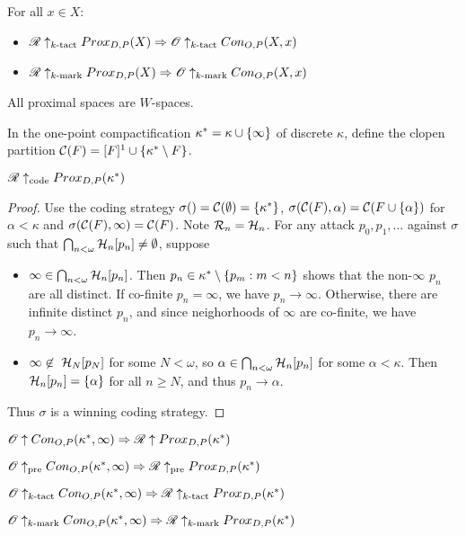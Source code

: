 \begin{corollary}
For all $x\in X$:
  \begin{itemize}
    \item
      $\mathscr{R}\uparrow_{k\text{-tact}} Prox_{D,P}(X) \Rightarrow \mathscr{O} \uparrow_{k\text{-tact}} Con_{O,P}(X,x)$
    \item
      $\mathscr{R}\uparrow_{k\text{-mark}} Prox_{D,P}(X) \Rightarrow \mathscr{O} \uparrow_{k\text{-mark}} Con_{O,P}(X,x)$
  \end{itemize}
\end{corollary}

\begin{corollary}
   All proximal spaces are $W$-spaces.
\end{corollary}

\begin{definition}
  In the one-point compactification $\kappa^*=\kappa\cup\{\infty\}$ of discrete $\kappa$, define the clopen partition $\mathcal{C}(F) = [F]^1\cup\{\kappa^*\setminus F\}$.
\end{definition}

\begin{theorem}
  $\mathscr{R}\uparrow_{\text{code}}Prox_{D,P}(\kappa^*)$
\end{theorem}

\begin{proof}
  Use the coding strategy $\sigma()=\mathcal{C}(\emptyset)=\{\kappa^*\}$, $\sigma(\mathcal{C}(F),\alpha)=\mathcal{C}(F\cup\{\alpha\})$ for $\alpha<\kappa$ and $\sigma(\mathcal{C}(F),\infty)=\mathcal{C}(F)$. Note $\mathcal{R}_n=\mathcal{H}_n$. For any attack $p_0,p_1,\dots$ against $\sigma$ such that $\bigcap_{n<\omega} \mathcal{H}_n[p_n]\not=\emptyset$, suppose 
    \begin{itemize}
      \item $\infty\in\bigcap_{n<\omega} \mathcal{H}_n[p_n]$. Then $p_n\in \kappa^*\setminus\{p_m:m<n\}$ shows that the non-$\infty$ $p_n$ are all distinct. If co-finite $p_n=\infty$, we have $p_n\to\infty$. Otherwise, there are infinite distinct $p_n$, and since neighorhoods of $\infty$ are co-finite, we have $p_n\to\infty$.
      \item $\infty\not\in\ \mathcal{H}_N[p_N]$ for some $N<\omega$, so $\alpha\in\bigcap_{n<\omega} \mathcal{H}_n[p_n]$ for some $\alpha<\kappa$. Then $\mathcal{H}_n[p_n]=\{\alpha\}$ for all $n\geq N$, and thus $p_n\to\alpha$.
    \end{itemize}
  Thus $\sigma$ is a winning coding strategy.
\end{proof}

\begin{theorem}
$\mathscr{O}\uparrow Con_{O,P}(\kappa^*,\infty) \Rightarrow \mathscr{R} \uparrow Prox_{D,P}(\kappa^*)$

$\mathscr{O}\uparrow_{\text{pre}} Con_{O,P}(\kappa^*,\infty) \Rightarrow \mathscr{R} \uparrow_{\text{pre}} Prox_{D,P}(\kappa^*)$

$\mathscr{O}\uparrow_{k\text{-tact}} Con_{O,P}(\kappa^*,\infty) \Rightarrow \mathscr{R} \uparrow_{k\text{-tact}} Prox_{D,P}(\kappa^*)$

$\mathscr{O}\uparrow_{k\text{-mark}} Con_{O,P}(\kappa^*,\infty) \Rightarrow \mathscr{R} \uparrow_{k\text{-mark}} Prox_{D,P}(\kappa^*)$
\end{theorem}

